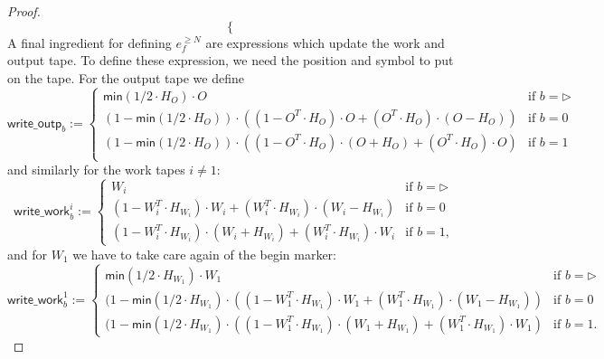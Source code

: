 \begin{proof}
$$\begin{cases}
\end{cases}
$$
A final ingredient for defining $e_f^{\geq N}$ are expressions which update the work and output tape.
To define these expression, we need the position and symbol to put on the tape. For the output tape we define
$$
\mathsf{write\_outp}_b:=\begin{cases}
\mathsf{min}(1/2\cdot H_O)\cdot O & \text{if $b=\rhd$}\\
(1-\mathsf{min}(1/2\cdot H_O))\cdot\left((1-O^T\cdot H_O)\cdot O + (O^T\cdot H_O)\cdot (O-H_O)\right) &\text{if $b=0$}\\
(1-\mathsf{min}(1/2\cdot H_O))\cdot\left((1-O^T\cdot H_O)\cdot (O+H_O) + (O^T\cdot H_O)\cdot O\right) &\text{if $b=1$}\\
\end{cases}
$$
and similarly for the work tapes $i\neq 1$:
$$
\mathsf{write\_work}_b^i:=\begin{cases}
W_i & \text{if $b=\rhd$}\\
(1-W_i^T\cdot H_{W_i})\cdot W_i + (W_i^T\cdot H_{W_i})\cdot (W_i-H_{W_i}) &\text{if $b=0$}\\
(1-W_i^T\cdot H_{W_i})\cdot (W_i+H_{W_i}) + (W_i^T\cdot H_{W_i})\cdot W_i &\text{if $b=1$},
\end{cases}
$$
and for  $W_1$ we have to take care again of the begin marker:
$$
\mathsf{write\_work}_b^1:=\begin{cases}
\mathsf{min}(1/2\cdot H_{W_1})\cdot W_1 & \text{if $b=\rhd$}\\
(1-\mathsf{min}(1/2\cdot H_{W_1})\cdot\left((1-W_1^T\cdot H_{W_1})\cdot W_1 + (W_1^T\cdot H_{W_1})\cdot (W_1-H_{W_1})\right) &\text{if $b=0$}\\
(1-\mathsf{min}(1/2\cdot H_{W_1})\cdot\left((1-W_1^T\cdot H_{W_1})\cdot (W_1+H_{W_1}) + (W_1^T\cdot H_{W_1})\cdot W_1\right) &\text{if $b=1$}.
\end{cases}
$$





\end{proof}
